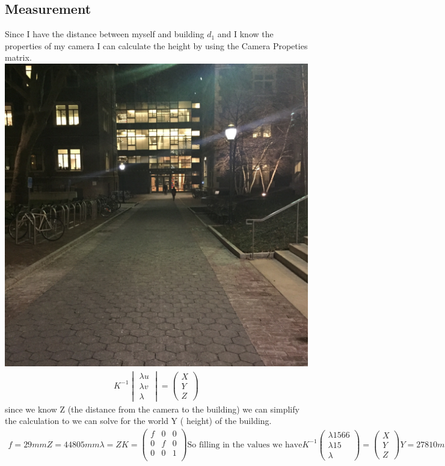 \documentclass[11pt,english]{article}
\begin{document}
\subsection*{Measurement} 
Since I have the distance between myself and building $d_1$ and I know the properties of my camera 
I can calculate the height by using the Camera Propeties matrix. 
\includegraphics[width = \linewidth]{IMG_2529.jpg}
\begin{align*}
K^{-1} \begin{vmatrix}
\lambda u \\ \lambda v \\ \lambda 
\end{vmatrix} = \begin{pmatrix}
X \\ Y \\ Z 
\end{pmatrix}
\end{align*}
since we know Z (the distance from the camera to the building) we can simplify the calculation to 
we can solve for the world Y ( height) of the building. 
\begin{align*}
f = 29mm 
Z = 44805 mm 
\lambda = Z 
K = \begin{pmatrix}
f & 0 & 0 \\ 
0 & f & 0 \\ 
0 & 0 & 1 \\ 
\end{pmatrix} 
\text{So filling in the values we have}
K^{-1} \begin{pmatrix} \lambda 1566 \\ \lambda 15 \\ \lambda \end{pmatrix} = \begin{pmatrix} X \\ Y \\ Z \end{pmatrix} 
Y = 27810 mm 
\end{align*} 
\end{document}
